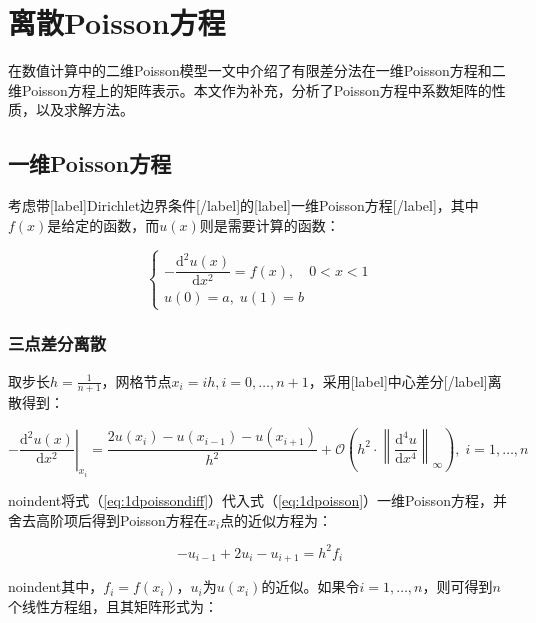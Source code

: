 \documentclass[12pt, UTF8, nofonts]{ctexart}
\begin{document}

\section*{离散Poisson方程}

在数值计算中的二维Poisson模型一文中介绍了有限差分法在一维Poisson方程和二维Poisson方程上的矩阵表示。本文作为补充，分析了Poisson方程中系数矩阵的性质，以及求解方法。

\subsection*{一维Poisson方程}

考虑带[label]Dirichlet边界条件[/label]的[label]一维Poisson方程[/label]，其中$f(x)$是给定的函数，而$u(x)$则是需要计算的函数：

\begin{equation}
    \label{eq:1dpoisson}
    \begin{cases}
        -\dfrac{\mathrm{d}^2u(x)}{\mathrm{d}x^2} = f(x), \quad 0<x<1 \\
        u(0)=a, \; u(1)=b
    \end{cases}
\end{equation}

\subsubsection*{三点差分离散}

取步长$h=\frac{1}{n+1}$，网格节点$x_i=ih,i=0,\ldots,n+1$，采用[label]中心差分[/label]离散得到：

\begin{equation}
    \label{eq:1dpoissondiff}
    \left. -\dfrac{\mathrm{d}^2u(x)}{\mathrm{d}x^2} \right|_{x_i} =
    \dfrac{2u(x_i)-u(x_{i-1})-u(x_{i+1})}{h^2} + \mathcal{O}
    \left(
        h^2 \cdot \left\|\dfrac{\mathrm{d}^4u}{\mathrm{d}x^4}\right\|_\infty
    \right), \; i=1,\ldots,n
\end{equation}

noindent将式（\ref{eq:1dpoissondiff}）代入式（\ref{eq:1dpoisson}）一维Poisson方程，并舍去高阶项后得到Poisson方程在$x_i$点的近似方程为：

\begin{equation*}
    -u_{i-1}+2u_i-u_{i+1} = h^2f_i
\end{equation*}

noindent其中，$f_i=f(x_i)$，$u_i$为$u(x_i)$的近似。如果令$i=1,\ldots,n$，则可得到$n$个线性方程组，且其矩阵形式为：
\end{document}
